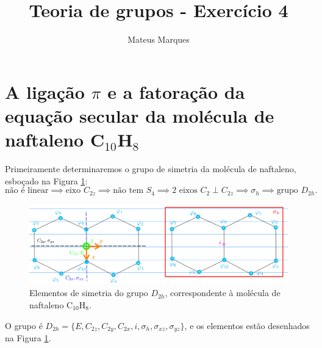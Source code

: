 \documentclass[a4paper,10pt]{article}
\title{\Huge{\textbf{Teoria de grupos - Exercício 4}}}
\author{Mateus Marques}
\begin{document}
\maketitle

\section*{A ligação $\pi$ e a fatoração da equação secular da molécula de naftaleno C$_{10}$H$_8$}

Primeiramente determinaremos o grupo de simetria da molécula de naftaleno, esboçado na Figura \ref{fig:D2h}:
$$
\text{não é linear} \implies \text{eixo }C_{2z} \implies \text{não tem }S_{4} \implies
\text{2 eixos }C_2 \perp C_{2z} \implies \sigma_h \implies \boxed{\text{grupo }D_{2h}.}
$$
\begin{figure}[H]
\centering
\includegraphics[width=1.0\linewidth]{fig/D2h.png}
\caption{Elementos de simetria do grupo $D_{2h}$, correspondente à molécula de naftaleno C$_{10}$H$_8$.}
\label{fig:D2h}
\end{figure}

O grupo é $D_{2h} = \{E, C_{2z}, C_{2y}, C_{2x}, i, \sigma_h, \sigma_{xz}, \sigma_{yz}\}$, e os elementos estão desenhados na Figura \ref{fig:D2h}.

\n
\end{document}
